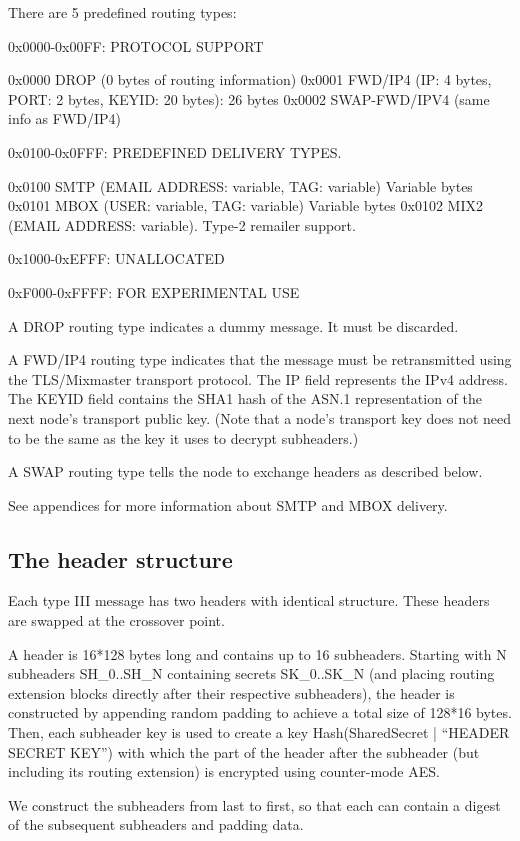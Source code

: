 There are 5 predefined routing types:

0x0000-0x00FF: PROTOCOL SUPPORT

0x0000 DROP    (0 bytes of routing information)
0x0001 FWD/IP4 (IP: 4 bytes, PORT: 2 bytes, KEYID: 20 bytes): 26 bytes
0x0002 SWAP-FWD/IPV4 (same info as FWD/IP4)

0x0100-0x0FFF: PREDEFINED DELIVERY TYPES.

0x0100 SMTP   (EMAIL ADDRESS: variable, TAG: variable) Variable bytes
0x0101 MBOX   (USER: variable, TAG: variable) Variable bytes
0x0102 MIX2   (EMAIL ADDRESS: variable).  Type-2 remailer support.

0x1000-0xEFFF: UNALLOCATED

0xF000-0xFFFF: FOR EXPERIMENTAL USE

A DROP routing type indicates a dummy message. It must be discarded.

A FWD/IP4 routing type indicates that the message must be
retransmitted using the TLS/Mixmaster transport protocol. The IP field
represents the IPv4 address.  The KEYID field contains the SHA1 hash
of the ASN.1 representation of the next node's transport public key.
(Note that a node's transport key does not need to be the same as the
key it uses to decrypt subheaders.)

A SWAP routing type tells the node to exchange headers as described below.

See appendices for more information about SMTP and MBOX delivery.

\subsection{The header structure}

Each type III message has two headers with identical structure. These
headers are swapped at the crossover point.

A header is 16*128 bytes long and contains up to 16
subheaders. Starting with N subheaders SH_0..SH_N containing secrets
SK_0..SK_N (and placing routing extension blocks directly after their
respective subheaders), the header is constructed by appending 
random padding to achieve a total size
of 128*16 bytes. Then, each subheader key is used to create a key
Hash(SharedSecret | ``HEADER SECRET KEY'') with which the part of the
header after the subheader (but including its routing extension) is
encrypted using counter-mode AES.

We construct the subheaders from last to first, so that each can contain
a digest of the subsequent subheaders and padding data.

